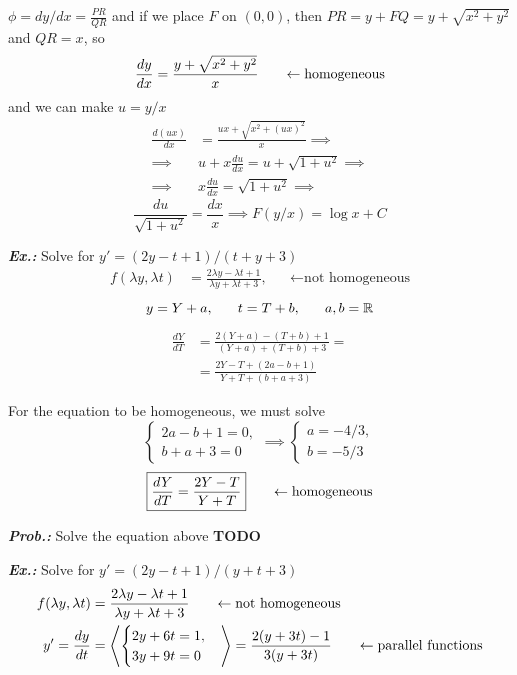 \documentclass[a4paper]{article}
\begin{document}
$\phi=dy / dx=\frac{PR}{QR}$ and if we place $F$ on $(0,0)$, then $PR=y+FQ=y+\sqrt{ x^{2}+y^{2} }$ and $QR=x$, so
$$
\frac{dy}{dx}=\frac{y+\sqrt{ x^{2}+y^{2} }}{x}\hspace{4ex}\leftarrow\text{homogeneous}
$$
and we can make $u=y / x$
\begin{align}
\frac{d(ux)}{dx}&=\frac{ux+\sqrt{ x^{2}+(ux)^{2} }}{x}\implies \\
\implies&u+x \frac{du}{dx}=u+\sqrt{ 1+u^{2} }\implies \\
\implies&x \frac{du}{dx}=\sqrt{ 1+u^{2} } \implies
\end{align}
$$
\boxed{\frac{du}{\sqrt{ 1+u^{2} }}=\frac{dx}{x} \implies F(y / x)=\log x+C}
$$

\textit{\textbf{Ex.:}} Solve for $y'=(2y-t+1) / (t+y+3)$
\begin{align}
f(\lambda y,\lambda t)&=\frac{2\lambda y-\lambda t+1}{\lambda y+\lambda t+3}, & &\leftarrow\text{not homogeneous}
\end{align}
$$
y=Y+a,\hspace{4ex}t=T+b,\hspace{4ex}a,b=\mathbb{R}
$$
\begin{align}
\frac{dY}{dT}&=\frac{2(Y+a)-(T+b)+1}{(Y+a)+(T+b)+3}= \\
&= \frac{2Y-T+(2a-b+1)}{Y+T+(b+a+3)}
\end{align}

For the equation to be homogeneous, we must solve
$$
\begin{cases}
2a-b+1=0, \\
b+a+3=0
\end{cases}\implies \begin{cases}
a=-4 / 3, \\
b=-5 / 3
\end{cases}
$$
$$
\boxed{\frac{dY}{dT}=\frac{2Y-T}{Y+T}}\hspace{4ex}\leftarrow\text{homogeneous}
$$

\textit{\textbf{Prob.:}} Solve the equation above \textbf{TODO}

\textit{\textbf{Ex.:}} Solve for $y'=(2y-t+1) / (y+t+3)$
\begin{align}
f(\lambda y,\lambda t)&=\frac{2\lambda y-\lambda t+1}{\lambda y+\lambda t+3}\hspace{4ex}\leftarrow\text{not homogeneous} \\
y'=\frac{dy}{dt}&=\left\langle\begin{cases}
2y+6t=1, \\
3y+9t=0
\end{cases}\right\rangle =\frac{2(y+3t)-1}{3(y+3t)} \hspace{4ex}\leftarrow\text{parallel functions}
\end{align}
\end{document}
